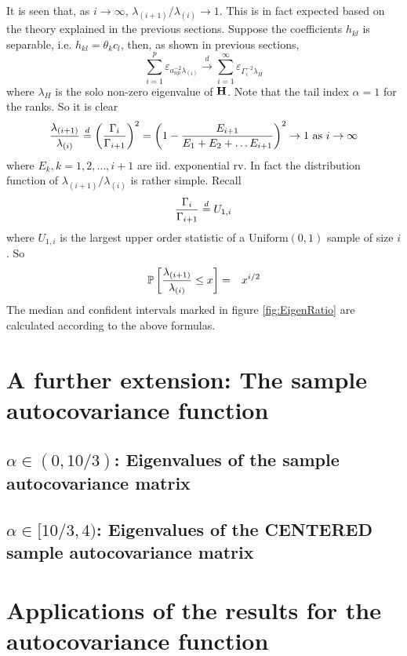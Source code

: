 \documentclass[11pt,reqno]{amsart}
\newcommand{\E}{\mathbb{E}}
\renewcommand{\P}{\mathbb{P}}
\newcommand{\1}{\mathds{1}}
\newcommand{\0}{\boldsymbol{0}}
\newcommand{\pp}[1]{\varepsilon_{#1}}
\newcommand{\4}{\mathchoice{\mskip1.5mu}{\mskip1.5mu}{}{}}
\newcommand{\5}{\mathchoice{\mskip-1.5mu}{\mskip-1.5mu}{}{}}
\newcommand{\2}{\penalty250\mskip\thickmuskip\mskip-\thinmuskip} %
\begin{document}
It is seen that, as $i \to \infty$, $\lambda_{(i+1)} / \lambda_{(i)}
\to 1$. This is in fact expected based on the theory explained in the
previous sections. Suppose the coefficients $h_{kl}$ is separable,
i.e. $h_{kl} = \theta_k c_l$, then, as shown in previous sections,
\[
\sum_{i=1}^p \pp{a_{np}^{-2}\lambda_{(i)}} \overset{d}{\to}
\sum_{i=1}^\infty \pp{\Gamma_i^{-2} \lambda_H}
\]
where $\lambda_H$ is the solo non-zero eigenvalue of $\bf H$. Note
that the tail index $\alpha=1$ for the ranks. So it is clear
\[
{\lambda_{(i+1)} \over 
  \lambda_{(i)}} \overset{d}{=} \left({\Gamma_i \over
    \Gamma_{i+1}}\right)^{2}=\left(1 - {E_{i+1} \over E_1 + E_2
    + \dots E_{i+1}}\right)^{2} \to 1 \text{ as } i \to \infty
\]
where $E_k, k=1,2,\dots,i+1$ are iid. exponential rv. In fact the
distribution function of $\lambda_{(i+1)} / \lambda_{(i)}$ is rather
simple. Recall
\[
{\Gamma_{i} \over \Gamma_{i+1}} \overset{d}{=} U_{1, i}
\]
where $U_{1, i}$ is the largest upper order statistic of a
$\text{Uniform}(0, 1)$ sample of size $i$. So
\begin{eqnarray*}
\P\left[{\lambda_{(i+1)} \over \lambda_{(i)}} \leq x \right] &=& x^{i/2}
\end{eqnarray*}
The median and confident intervals marked in figure
\ref{fig:EigenRatio} are calculated according to the above formulas.


\section{A further extension: The sample autocovariance function}

\subsection{$\alpha \in (0,10/3)$: Eigenvalues of the sample
  autocovariance matrix} 
\subsection{$\alpha \in [10/3,4)$: Eigenvalues of the CENTERED sample
  autocovariance matrix}

\section{Applications of the results for the autocovariance function}
\end{document}
